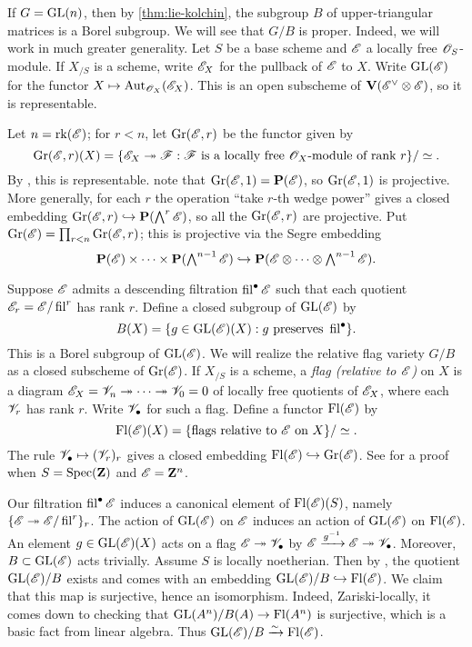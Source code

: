 \begin{example}
If $G=\operatorname{GL}(n)$, then by \autoref{thm:lie-kolchin}, the subgroup $B$ of 
upper-triangular matrices is a Borel subgroup. We will see that 
$G/B$ is proper. Indeed, we will work in much greater generality. Let $S$ be a 
base scheme and $\mathscr{E}$ a locally free $\mathscr{O}_S$-module. If $X_{/S}$ is a scheme, 
write $\mathscr{E}_X$ for the pullback of $\mathscr{E}$ to $X$. Write $\operatorname{GL}(\mathscr{E})$ for the 
functor $X\mapsto \operatorname{Aut}_{\mathscr{O}_X}(\mathscr{E}_X)$. This is an open subscheme of 
$\mathbf{V}(\mathscr{E}^\vee\otimes \mathscr{E})$, so it is representable. 

Let $n=\operatorname{rk}(\mathscr{E})$; for $r<n$, let $\operatorname{Gr}(\mathscr{E},r)$ be the functor given 
by 
\[
  \operatorname{Gr}(\mathscr{E},r)(X) = \{\mathscr{E}_X\twoheadrightarrow \mathscr{F}:\text{$\mathscr{F}$ is a locally free $\mathscr{O}_X$-module of rank $r$}\} /\simeq .
\]
By \cite[ex.2]{nitsure-2005}, this is representable. note that 
$\operatorname{Gr}(\mathscr{E},1) = \mathbf{P}(\mathscr{E})$, so $\operatorname{Gr}(\mathscr{E},1)$ is projective. 
More generally, for each $r$ the operation ``take $r$-th wedge power'' gives 
a closed embedding $\operatorname{Gr}(\mathscr{E},r) \hookrightarrow \mathbf{P}(\bigwedge^r\mathscr{E})$, so all 
the $\operatorname{Gr}(\mathscr{E},r)$ are projective. Put 
$\operatorname{Gr}(\mathscr{E})=\prod_{r<n} \operatorname{Gr}(\mathscr{E},r)$; this is 
projective via the Segre embedding \cite[II 4.3.3]{ega2}
\[
  \mathbf{P}(\mathscr{E})\times \cdots \times \mathbf{P}(\textstyle\bigwedge^{n-1}\mathscr{E})\hookrightarrow \mathbf{P}(\mathscr{E}\otimes \cdots \otimes \textstyle\bigwedge^{n-1} \mathscr{E}) .
\]

Suppose $\mathscr{E}$ admits a descending filtration $\operatorname{fil}^\bullet\mathscr{E}$ such that 
each quotient $\mathscr{E}_r=\mathscr{E}/\operatorname{fil}^r$ has rank $r$. Define a closed subgroup 
of $\operatorname{GL}(\mathscr{E})$ by 
\[
  B(X) = \{g\in \operatorname{GL}(\mathscr{E})(X):g\text{ preserves }\operatorname{fil}^\bullet\} .
\]
This is a Borel subgroup of $\operatorname{GL}(\mathscr{E})$. We will realize the relative 
flag variety $G/B$ as a closed subscheme of $\operatorname{Gr}(\mathscr{E})$. 
If $X_{/S}$ is a scheme, a \emph{flag (relative to $\mathscr{E}$)} on $X$ is a diagram 
$\mathscr{E}_X=\mathscr{V}_n\twoheadrightarrow \cdots \twoheadrightarrow \mathscr{V}_0=0$ of locally free quotients of $\mathscr{E}_X$, 
where each $\mathscr{V}_r$ has rank $r$. Write $\mathscr{V}_\bullet$ for such a flag. Define a 
functor $\operatorname{Fl}(\mathscr{E})$ by 
\[
  \operatorname{Fl}(\mathscr{E})(X) = \{\text{flags relative to $\mathscr{E}$ on $X$}\} / \simeq .
\]
The rule $\mathscr{V}_\bullet\mapsto (\mathscr{V}_r)_r$ gives a closed embedding 
$\operatorname{Fl}(\mathscr{E})\hookrightarrow \operatorname{Gr}(\mathscr{E})$. See 
\cite[I \S 2 6.3]{demazure-gabriel-1980} for a proof when $S=\operatorname{Spec}(\mathbf{Z})$ 
and $\mathscr{E}=\mathbf{Z}^n$. 

Our filtration $\operatorname{fil}^\bullet\mathscr{E}$ induces a canonical element of 
$\operatorname{Fl}(\mathscr{E})(S)$, namely $\{\mathscr{E}\twoheadrightarrow\mathscr{E}/\operatorname{fil}^r\}_r$. The action of 
$\operatorname{GL}(\mathscr{E})$ on $\mathscr{E}$ induces an action of $\operatorname{GL}(\mathscr{E})$ on $\operatorname{Fl}(\mathscr{E})$. An 
element $g\in \operatorname{GL}(\mathscr{E})(X)$ acts on a flag $\mathscr{E}\twoheadrightarrow \mathscr{V}_\bullet$ by 
$\mathscr{E}\xrightarrow{g^{-1}} \mathscr{E}\twoheadrightarrow \mathscr{V}_\bullet$. Moreover, $B\subset \operatorname{GL}(\mathscr{E})$ 
acts trivially. Assume $S$ is locally noetherian. Then by 
\cite[V 10.1.1]{sga3-i}, the quotient $\operatorname{GL}(\mathscr{E})/B$ exists and comes with 
an embedding $\operatorname{GL}(\mathscr{E})/B\hookrightarrow \operatorname{Fl}(\mathscr{E})$. We claim that this map is 
surjective, hence an isomorphism. Indeed, Zariski-locally, it comes down to 
checking that $\operatorname{GL}(A^n)/B(A)\to \operatorname{Fl}(A^n)$ is surjective, which is a basic 
fact from linear algebra. Thus $\operatorname{GL}(\mathscr{E})/B\xrightarrow\sim \operatorname{Fl}(\mathscr{E})$. 
\end{example}

